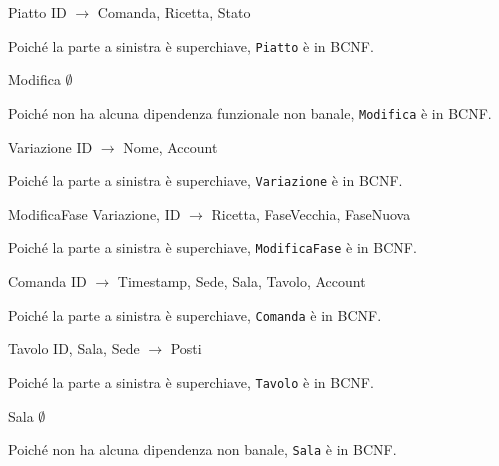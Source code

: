 \begin{samepage}
\begin{funcdep}{Piatto}
    ID $\to$ Comanda, Ricetta, Stato
\end{funcdep}
Poiché la parte a sinistra è superchiave, {\tt Piatto} è in BCNF.
\end{samepage}

\begin{samepage}
\begin{funcdep}{Modifica}
    $\emptyset$
\end{funcdep}
Poiché non ha alcuna dipendenza funzionale non banale, {\tt Modifica} è in BCNF.
\end{samepage}

\begin{samepage}
\begin{funcdep}{Variazione}
    ID $\to$ Nome, Account
\end{funcdep}
Poiché la parte a sinistra è superchiave, {\tt Variazione} è in BCNF.
\end{samepage}

\begin{samepage}
\begin{funcdep}{ModificaFase}
    Variazione, ID $\to$ Ricetta, FaseVecchia, FaseNuova
\end{funcdep}
Poiché la parte a sinistra è superchiave, {\tt ModificaFase} è in BCNF.
\end{samepage}

\begin{samepage}
\begin{funcdep}{Comanda}
    ID $\to$ Timestamp, Sede, Sala, Tavolo, Account
\end{funcdep}
Poiché la parte a sinistra è superchiave, {\tt Comanda} è in BCNF.
\end{samepage}

\begin{samepage}
\begin{funcdep}{Tavolo}
    ID, Sala, Sede $\to$ Posti
\end{funcdep}
Poiché la parte a sinistra è superchiave, {\tt Tavolo} è in BCNF.
\end{samepage}

\begin{samepage}
\begin{funcdep}{Sala}
    $\emptyset$
\end{funcdep}
Poiché non ha alcuna dipendenza non banale, {\tt Sala} è in BCNF.
\end{samepage}

